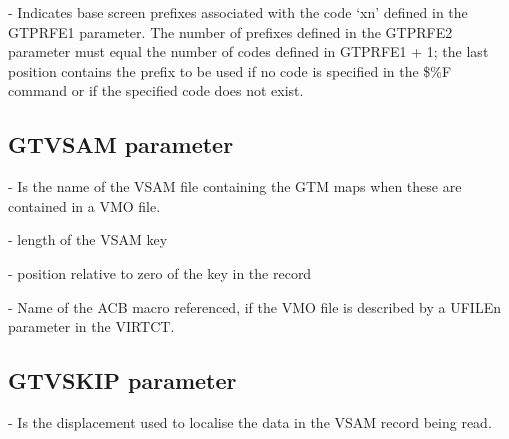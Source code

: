 \documentclass[letterpaper,10pt,english]{sphinxmanual}
\begin{document}
 - Indicates base screen prefixes associated with the code ‘xn’ defined in the GTPRFE1 parameter. The number of prefixes defined in the GTPRFE2 parameter must equal the number of codes defined in GTPRFE1 + 1; the last position contains the prefix to be used if no code is specified in the \$\%F command or if the specified code does not exist.


\subsection{GTVSAM parameter}
\label{\detokenize{Installation_Guide:gtvsam-parameter}}\label{\detokenize{Installation_Guide:index-72}}
\begin{sphinxVerbatim}[commandchars=\\\{\}]
       
\end{sphinxVerbatim}

 - Is the name of the VSAM file containing the GTM maps when these are contained in a VMO file.

 - length of the VSAM key

 - position relative to zero of the key in the record

 - Name of the ACB macro referenced, if the VMO file is described by a UFILEn parameter in the VIRTCT.


\subsection{GTVSKIP parameter}
\label{\detokenize{Installation_Guide:gtvskip-parameter}}\label{\detokenize{Installation_Guide:index-73}}
\begin{sphinxVerbatim}[commandchars=\\\{\}]
                
\end{sphinxVerbatim}

 - Is the displacement used to localise the data in the VSAM record being read.
\end{document}
